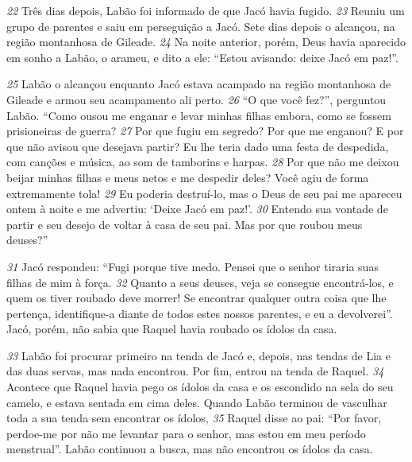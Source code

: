 \bigskip   
\textit{\tiny 22}
Três dias depois, Labão foi informado de que Jacó havia fugido. 
\textit{\tiny 23}
Reuniu um
grupo de parentes e saiu em perseguição a Jacó. Sete dias depois o alcançou, na
região montanhosa de Gileade. 
\textit{\tiny 24}
Na noite anterior, porém, Deus havia aparecido
em sonho a Labão, o arameu, e dito a ele: “Estou avisando: deixe Jacó em paz!”.

\bigskip   
\textit{\tiny 25}
Labão o alcançou enquanto Jacó estava acampado na região montanhosa de
Gileade e armou seu acampamento ali perto. 
\textit{\tiny 26}
“O que você fez?”, perguntou
Labão. “Como ousou me enganar e levar minhas filhas embora, como se fossem
prisioneiras de guerra? 
\textit{\tiny 27}
Por que fugiu em segredo? Por que me enganou? E por
que não avisou que desejava partir? Eu lhe teria dado uma festa de despedida,
com canções e música, ao som de tamborins e harpas. 
\textit{\tiny 28}
Por que não me deixou beijar minhas filhas e meus netos e me despedir deles? Você agiu de forma
extremamente tola! 
\textit{\tiny 29}
Eu poderia destruí-lo, mas o Deus de seu pai me apareceu
ontem à noite e me advertiu: ‘Deixe Jacó em paz!’. 
\textit{\tiny 30}
Entendo sua vontade de
partir e seu desejo de voltar à casa de seu pai. Mas por que roubou meus deuses?”

\bigskip   
\textit{\tiny 31}
Jacó respondeu: “Fugi porque tive medo. Pensei que o senhor tiraria suas
filhas de mim à força. 
\textit{\tiny 32}
Quanto a seus deuses, veja se consegue encontrá-los, e
quem os tiver roubado deve morrer! Se encontrar qualquer outra coisa que lhe
pertença, identifique-a diante de todos estes nossos parentes, e eu a devolverei”.
Jacó, porém, não sabia que Raquel havia roubado os ídolos da casa.

\bigskip   
\textit{\tiny 33}
Labão foi procurar primeiro na tenda de Jacó e, depois, nas tendas de Lia e
das duas servas, mas nada encontrou. Por fim, entrou na tenda de Raquel.
\textit{\tiny 34}
Acontece que Raquel havia pego os ídolos da casa e os escondido na sela do seu
camelo, e estava sentada em cima deles. Quando Labão terminou de vasculhar
toda a sua tenda sem encontrar os ídolos, 
\textit{\tiny 35}
Raquel disse ao pai: “Por favor,
perdoe-me por não me levantar para o senhor, mas estou em meu período
menstrual”. Labão continuou a busca, mas não encontrou os ídolos da casa.

